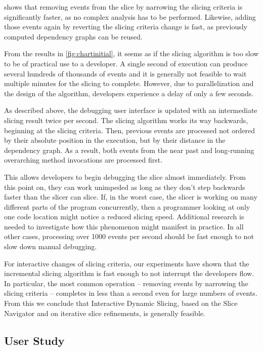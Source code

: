 \documentclass[
			english,
			]{elsarticle}
\begin{document}
 shows that removing events from the slice by narrowing the slicing criteria is significantly faster, as no complex analysis has to be performed.
Likewise, adding those events again by reverting the slicing criteria change is fast, as previously computed dependency graphs can be reused.

\medskip

From the results in \cref{fig:chartinitial}, it seems as if the slicing algorithm is too slow to be of practical use to a developer.
A single second of execution can produce several hundreds of thousands of events and it is generally not feasible to wait multiple minutes for the slicing to complete.
However, due to parallelization and the design of the algorithm, developers experience a delay of only a few seconds.

As described above, the debugging user interface is updated with an intermediate slicing result twice per second.
The slicing algorithm works its way backwards, beginning at the slicing criteria.
Then, previous events are processed not ordered by their absolute position in the execution, but by their distance in the dependency graph.
As a result, both events from the near past and long-running overarching method invocations are processed first.

This allows developers to begin debugging the slice almost immediately. 
From this point on, they can work unimpeded as long as they don't step backwards faster than the slicer can slice.
If, in the worst case, the slicer is working on many different parts of the program concurrently, then a programmer looking at only one code location might notice a reduced slicing speed.
Additional research is needed to investigate how this phenomenon might manifest in practice.
In all other cases, processing over 1000 events per second should be fast enough to not slow down manual debugging.

For interactive changes of slicing criteria, our experiments have shown that the incremental slicing algorithm is fast enough to not interrupt the developers flow.
In particular, the most common operation -- removing events by narrowing the slicing criteria -- completes in less than a second even for large numbers of events.
From this we conclude that Interactive Dynamic Slicing, based on the Slice Navigator and on iterative slice refinements, is generally feasible.

\subsection{User Study}
\end{document}
